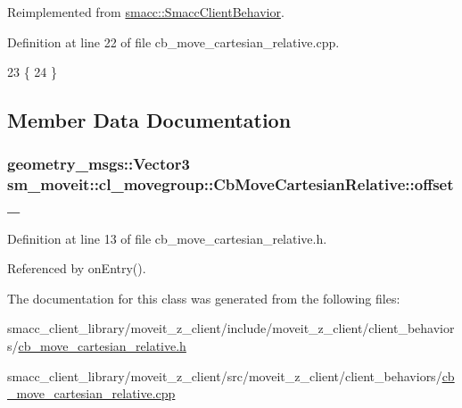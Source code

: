 Reimplemented from \hyperlink{classsmacc_1_1SmaccClientBehavior_ac0cd72d42bd00425362a97c9803ecce5}{smacc\+::\+Smacc\+Client\+Behavior}.



Definition at line 22 of file cb\+\_\+move\+\_\+cartesian\+\_\+relative.\+cpp.


\begin{DoxyCode}
23 \{
24 \}
\end{DoxyCode}


\subsection{Member Data Documentation}
\subsubsection[{\texorpdfstring{offset\+\_\+}{offset_}}]{\setlength{\rightskip}{0pt plus 5cm}geometry\+\_\+msgs\+::\+Vector3 sm\+\_\+moveit\+::cl\+\_\+movegroup\+::\+Cb\+Move\+Cartesian\+Relative\+::offset\+\_\+}\hypertarget{classsm__moveit_1_1cl__movegroup_1_1CbMoveCartesianRelative_ae6be0657c538de613e203abd9acb761e}{}\label{classsm__moveit_1_1cl__movegroup_1_1CbMoveCartesianRelative_ae6be0657c538de613e203abd9acb761e}


Definition at line 13 of file cb\+\_\+move\+\_\+cartesian\+\_\+relative.\+h.



Referenced by on\+Entry().



The documentation for this class was generated from the following files\+:\begin{DoxyCompactItemize}
\item 
smacc\+\_\+client\+\_\+library/moveit\+\_\+z\+\_\+client/include/moveit\+\_\+z\+\_\+client/client\+\_\+behaviors/\hyperlink{cb__move__cartesian__relative_8h}{cb\+\_\+move\+\_\+cartesian\+\_\+relative.\+h}\item 
smacc\+\_\+client\+\_\+library/moveit\+\_\+z\+\_\+client/src/moveit\+\_\+z\+\_\+client/client\+\_\+behaviors/\hyperlink{cb__move__cartesian__relative_8cpp}{cb\+\_\+move\+\_\+cartesian\+\_\+relative.\+cpp}\end{DoxyCompactItemize}
